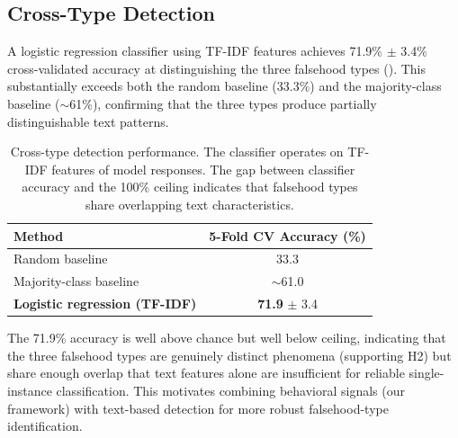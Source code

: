 \subsection{Cross-Type Detection}
\label{sec:crosstype_results}

A logistic regression classifier using TF-IDF features achieves 71.9\% $\pm$ 3.4\% cross-validated accuracy at distinguishing the three falsehood types (). This substantially exceeds both the random baseline (33.3\%) and the majority-class baseline (${\sim}$61\%), confirming that the three types produce partially distinguishable text patterns.

\begin{table}[t]
    \centering
    \caption{Cross-type detection performance. The classifier operates on TF-IDF features of model responses. The gap between classifier accuracy and the 100\% ceiling indicates that falsehood types share overlapping text characteristics.}
    \begin{tabular}{@{}lc@{}}
        \toprule
        \textbf{Method} & \textbf{5-Fold CV Accuracy (\%)} \\
        \midrule
        Random baseline & 33.3 \\
        Majority-class baseline & ${\sim}$61.0 \\
        \textbf{Logistic regression (TF-IDF)} & \textbf{71.9} {\scriptsize $\pm$ 3.4} \\
        \bottomrule
    \end{tabular}
    \label{tab:crosstype}
\end{table}

The 71.9\% accuracy is well above chance but well below ceiling, indicating that the three falsehood types are genuinely distinct phenomena (supporting H2) but share enough overlap that text features alone are insufficient for reliable single-instance classification. This motivates combining behavioral signals (our framework) with text-based detection for more robust falsehood-type identification.
